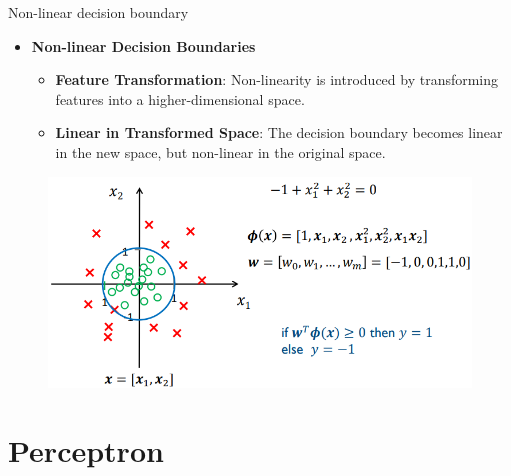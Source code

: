 \documentclass[serif, aspectratio=169]{beamer}
\begin{document}
\begin{frame}{Non-linear decision boundary}
    \begin{itemize}
        \item \textbf{Non-linear Decision Boundaries}
        \begin{itemize}\itemsep1em
            \item \justifying \textbf{Feature Transformation}: Non-linearity is introduced by transforming features into a higher-dimensional space.
            \item \justifying \textbf{Linear in Transformed Space}: The decision boundary becomes linear in the new space, but non-linear in the original space.
        \end{itemize}
    \end{itemize}
    \endminipage
    \hfill
        \begin{figure}[bh]
            \includegraphics[width=\textwidth]{pic/Figure_10.png}
        \end{figure}
    \endminipage
    \vfill
\end{frame}


\section{Perceptron}
\end{document}
